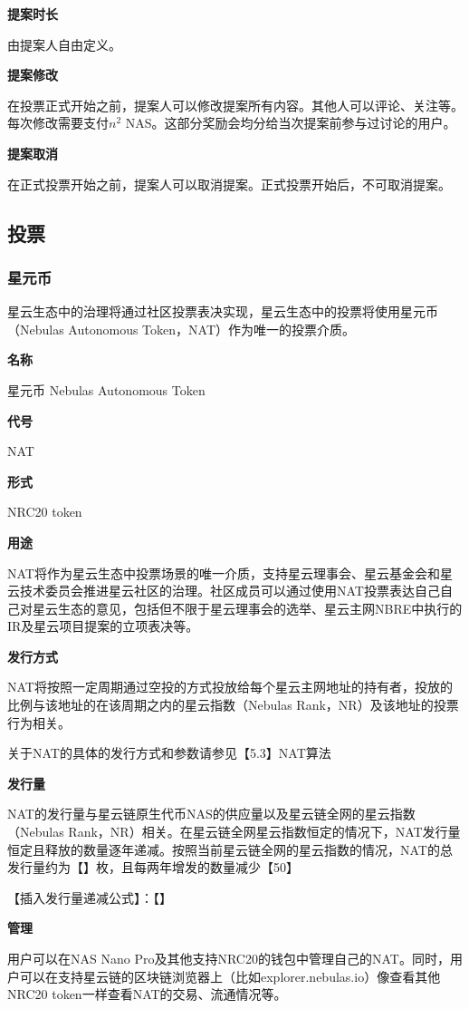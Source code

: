 \textbf{提案时长}

由提案人自由定义。

\textbf{提案修改}

在投票正式开始之前，提案人可以修改提案所有内容。其他人可以评论、关注等。每次修改需要支付$n^2$ NAS。这部分奖励会均分给当次提案前参与过讨论的用户。

\textbf{提案取消}

在正式投票开始之前，提案人可以取消提案。正式投票开始后，不可取消提案。

\subsection{投票}
\subsubsection{星元币}
星云生态中的治理将通过社区投票表决实现，星云生态中的投票将使用星元币（Nebulas Autonomous Token，NAT）作为唯一的投票介质。

\textbf{名称}
 
星元币 Nebulas Autonomous Token

\textbf{代号}

NAT

\textbf{形式}

NRC20 token

\textbf{用途}

NAT将作为星云生态中投票场景的唯一介质，支持星云理事会、星云基金会和星云技术委员会推进星云社区的治理。社区成员可以通过使用NAT投票表达自己自己对星云生态的意见，包括但不限于星云理事会的选举、星云主网NBRE中执行的IR及星云项目提案的立项表决等。

\textbf{发行方式}

NAT将按照一定周期通过空投的方式投放给每个星云主网地址的持有者，投放的比例与该地址的在该周期之内的星云指数（Nebulas Rank，NR）及该地址的投票行为相关。

关于NAT的具体的发行方式和参数请参见【5.3】NAT算法

\textbf{发行量}
	
NAT的发行量与星云链原生代币NAS的供应量以及星云链全网的星云指数（Nebulas Rank，NR）相关。在星云链全网星云指数恒定的情况下，NAT发行量恒定且释放的数量逐年递减。按照当前星云链全网的星云指数的情况，NAT的总发行量约为【】枚，且每两年增发的数量减少【50】%

【插入发行量递减公式】：【】

\textbf{管理}

用户可以在NAS Nano Pro及其他支持NRC20的钱包中管理自己的NAT。同时，用户可以在支持星云链的区块链浏览器上（比如explorer.nebulas.io）像查看其他NRC20 token一样查看NAT的交易、流通情况等。

